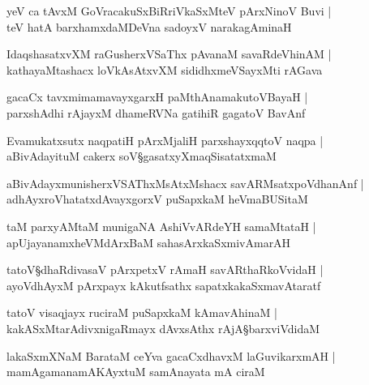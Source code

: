 \begin{shloka}
yeV ca tAvxM GoVracakuSxBiRriVkaSxMteV pArxNinoV Buvi |\\
teV hatA barxhamxdaMDeVna sadoyxV narakagAminaH 
\end{shloka}

\begin{shloka}
IdaqshasatxvXM raGusherxVSaThx pAvanaM savaRdeVhinAM |\\
kathayaMtashacx loVkAsAtxvXM sididhxmeVSayxMti rAGava
\end{shloka}

\begin{shloka}
gacaCx tavxmimamavayxgarxH paMthAnamakutoVBayaH |\\
parxshAdhi rAjayxM dhameRVNa gatihiR gagatoV BavAnf
\end{shloka}

\begin{shloka}
Evamukatxsutx naqpatiH pArxMjaliH parxshayxqqtoV naqpa |\\
aBivAdayituM cakerx soV\S gasatxyXmaqSisatatxmaM
\end{shloka}

\begin{shloka}
aBivAdayxmunisherxVSAThxMsAtxMshacx savARMsatxpoVdhanAnf |\\
adhAyxroVhatatxdAvayxgorxV puSapxkaM heVmaBUSitaM 
\end{shloka}

\begin{shloka}
taM parxyAMtaM munigaNA AshiVvARdeYH samaMtataH |\\
apUjayanamxheVMdArxBaM sahasArxkaSxmivAmarAH 
\end{shloka}

\begin{shloka}
tatoV\S dhaRdivasaV pArxpetxV rAmaH savARthaRkoVvidaH |\\
ayoVdhAyxM pArxpayx kAkutfsathx sapatxkakaSxmavAtaratf 
\end{shloka}

\begin{shloka}
tatoV visaqjayx ruciraM puSapxkaM kAmavAhinaM |\\
kakASxMtarAdivxnigaRmayx dAvxsAthx\R{} rAjA\S barxviVdidaM
\end{shloka}

\begin{shloka}
lakaSxmXNaM BarataM ceYva gacaCxdhavxM laGuvikarxmAH |\\
mamAgamanamAKAyxtuM samAnayata mA ciraM 
\end{shloka}

